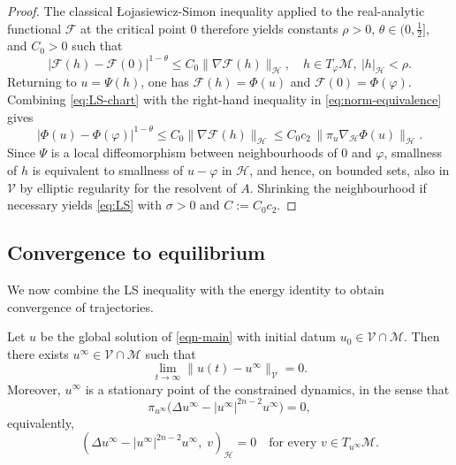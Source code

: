 \documentclass[reqno]{amsart}
\begin{document}
\begin{proof}
The classical \L{o}jasiewicz-Simon inequality applied to the real-analytic functional
$\mathcal F$ at the critical point $0$ therefore yields constants $\rho>0$,
$\theta\in(0,\tfrac12]$, and $C_0>0$ such that
\begin{equation}\label{eq:LS-chart}
|\mathcal F(h)-\mathcal F(0)|^{1-\theta}\le C_0\|\nabla\mathcal F(h)\|_{\mathcal H},
\quad h\in T_\varphi\mathcal M,\ |h|_{\mathcal H}<\rho.
\end{equation}
Returning to $u=\Psi(h)$, one has $\mathcal F(h)=\Phi(u)$ and
 $\mathcal F(0)=\Phi(\varphi)$.
Combining \eqref{eq:LS-chart} with the right-hand inequality in
\eqref{eq:norm-equivalence} gives
\[
|\Phi(u)-\Phi(\varphi)|^{1-\theta}
\le C_0\|\nabla\mathcal F(h)\|_{\mathcal H}
\le C_0 c_2\,\|\pi_u\nabla_{\mathcal H}\Phi(u)\|_{\mathcal H}.
\]
Since $\Psi$ is a local diffeomorphism between neighbourhoods of $0$ and $\varphi$,
smallness of $h$ is equivalent to smallness of $u-\varphi$ in $\mathcal H$, and hence,
on bounded sets, also in $\mathcal V$ by elliptic regularity for the resolvent of $A$.
Shrinking the neighbourhood if necessary yields \eqref{eq:LS} with $\sigma>0$ and
$C:=C_0c_2$.
\end{proof}

\subsection*{Convergence to equilibrium}
We now combine the LS inequality with the energy identity to obtain convergence
of trajectories.

\begin{theorem} \label{thm:conv}
Let $u$ be the global solution of \eqref{eqn-main} with initial datum
$u_0\in\mathcal V\cap\mathcal M$. Then there exists
$u^\infty\in\mathcal V\cap\mathcal M$ such that
\[
\lim_{t\to\infty}\|u(t)-u^\infty\|_{\mathcal V}=0.
\]
Moreover, $u^\infty$ is a stationary point of the constrained dynamics, in the
sense that
\begin{equation}\label{eq:stationary-uinf}
\pi_{u^\infty}\bigl(\Delta u^\infty-|u^\infty|^{2n-2}u^\infty\bigr)=0,
\end{equation}
equivalently,
\[
(\Delta u^\infty-|u^\infty|^{2n-2}u^\infty,\;v)_{\mathcal H}=0
\quad\text{for every }v\in T_{u^\infty}\mathcal M.
\]
\end{theorem}
\end{document}
